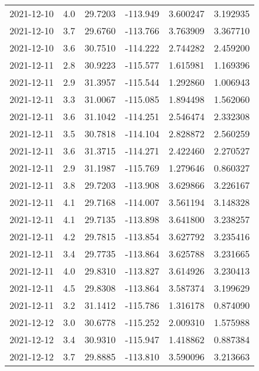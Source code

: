 \begin{tabular}{lrrrrr}
2021-12-10 &       4.0 &  29.7203 &  -113.949 &         3.600247 &         3.192935 \\
2021-12-10 &       3.7 &  29.6760 &  -113.766 &         3.763909 &         3.367710 \\
2021-12-10 &       3.6 &  30.7510 &  -114.222 &         2.744282 &         2.459200 \\
2021-12-11 &       2.8 &  30.9223 &  -115.577 &         1.615981 &         1.169396 \\
2021-12-11 &       2.9 &  31.3957 &  -115.544 &         1.292860 &         1.006943 \\
2021-12-11 &       3.3 &  31.0067 &  -115.085 &         1.894498 &         1.562060 \\
2021-12-11 &       3.6 &  31.1042 &  -114.251 &         2.546474 &         2.332308 \\
2021-12-11 &       3.5 &  30.7818 &  -114.104 &         2.828872 &         2.560259 \\
2021-12-11 &       3.6 &  31.3715 &  -114.271 &         2.422460 &         2.270527 \\
2021-12-11 &       2.9 &  31.1987 &  -115.769 &         1.279646 &         0.860327 \\
2021-12-11 &       3.8 &  29.7203 &  -113.908 &         3.629866 &         3.226167 \\
2021-12-11 &       4.1 &  29.7168 &  -114.007 &         3.561194 &         3.148328 \\
2021-12-11 &       4.1 &  29.7135 &  -113.898 &         3.641800 &         3.238257 \\
2021-12-11 &       4.2 &  29.7815 &  -113.854 &         3.627792 &         3.235416 \\
2021-12-11 &       3.4 &  29.7735 &  -113.864 &         3.625788 &         3.231665 \\
2021-12-11 &       4.0 &  29.8310 &  -113.827 &         3.614926 &         3.230413 \\
2021-12-11 &       4.5 &  29.8308 &  -113.864 &         3.587374 &         3.199629 \\
2021-12-11 &       3.2 &  31.1412 &  -115.786 &         1.316178 &         0.874090 \\
2021-12-12 &       3.0 &  30.6778 &  -115.252 &         2.009310 &         1.575988 \\
2021-12-12 &       3.4 &  30.9310 &  -115.947 &         1.418862 &         0.887384 \\
2021-12-12 &       3.7 &  29.8885 &  -113.810 &         3.590096 &         3.213663 \\

\end{tabular}
